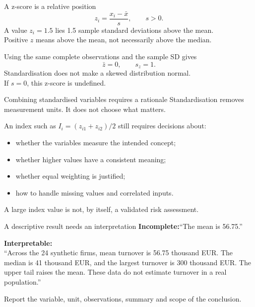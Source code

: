 \begin{frame}{A z-score is a relative position}
\[z_i=\frac{x_i-\bar{x}}s,\qquad s>0.\]
A value $z_i=1.5$ lies 1.5 sample standard deviations above the mean.\\
Positive $z$ means above the mean, not necessarily above the median.
\par\vspace{3mm}
Using the same complete observations and the sample SD gives
\[\bar z=0,\qquad s_z=1.\]
Standardisation does not make a skewed distribution normal.\\
If $s=0$, this z-score is undefined.
\end{frame}

\begin{frame}{Combining standardised variables requires a rationale}
Standardisation removes measurement units. It does not choose what matters.
\par\vspace{3mm}
An index such as $I_i=(z_{i1}+z_{i2})/2$ still requires decisions about:
\begin{itemize}
\item whether the variables measure the intended concept;
\item whether higher values have a consistent meaning;
\item whether equal weighting is justified;
\item how to handle missing values and correlated inputs.
\end{itemize}
A large index value is not, by itself, a validated risk assessment.
\end{frame}

\begin{frame}{A descriptive result needs an interpretation}
\textbf{Incomplete:}\quad ``The mean is 56.75.''
\par\vspace{3mm}
\textbf{Interpretable:}\\
``Across the 24 synthetic firms, mean turnover is 56.75 thousand EUR. The median is 41 thousand EUR, and the largest turnover is 300 thousand EUR. The upper tail raises the mean. These data do not estimate turnover in a real population.''
\par\vspace{3mm}
Report the variable, unit, observations, summary and scope of the conclusion.
\end{frame}

